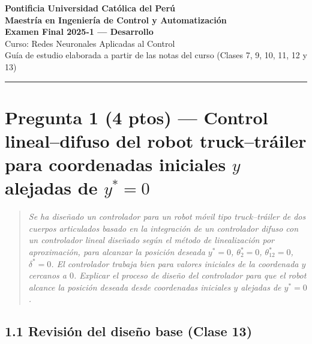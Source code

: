 \documentclass[11pt,a4paper]{article}
\newenvironment{enunciado}
{\begin{quote}\small\itshape\color{azulpucp}}
{\end{quote}}
\begin{document}
\begin{center}
{\large\bfseries Pontificia Universidad Católica del Perú}\\[2pt]
{\bfseries Maestría en Ingeniería de Control y Automatización}\\[8pt]
{\Large\bfseries Examen Final 2025-1 — Desarrollo}\\[4pt]
{\normalsize Curso: Redes Neuronales Aplicadas al Control}\\[2pt]
{\small Guía de estudio elaborada a partir de las notas del curso (Clases 7, 9, 10, 11, 12 y 13)}
\end{center}

\vspace{4pt}
\hrule
\vspace{10pt}

\section*{Pregunta 1 (4 ptos) — Control lineal--difuso del robot truck--tráiler para coordenadas iniciales $y$ alejadas de $y^{*}=0$}

\begin{enunciado}
Se ha diseñado un controlador para un robot móvil tipo truck--tráiler de dos cuerpos articulados basado en la integración de un controlador difuso con un controlador lineal diseñado según el método de linealización por aproximación, para alcanzar la posición deseada $y^{*}=0$, $\theta_2^{*}=0$, $\theta_{12}^{*}=0$, $\delta^{*}=0$. El controlador trabaja bien para valores iniciales de la coordenada $y$ cercanos a $0$. Explicar el proceso de diseño del controlador para que el robot alcance la posición deseada desde coordenadas iniciales $y$ alejadas de $y^{*}=0$.
\end{enunciado}

\subsection*{1.1 Revisión del diseño base (Clase 13)}
\end{document}

